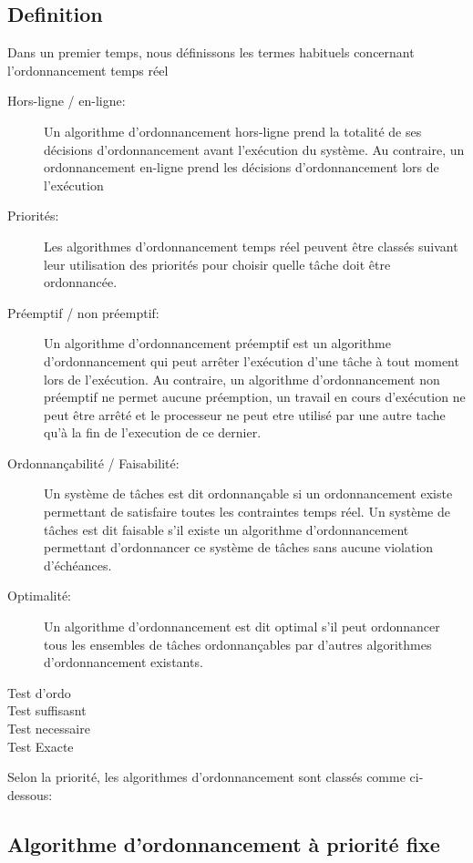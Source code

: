 \subsection*{Definition}
Dans un premier temps, nous définissons les termes habituels concernant
l'ordonnancement temps réel
\begin{description}
\item[Hors-ligne / en-ligne:] Un algorithme d’ordonnancement
  hors-ligne prend la totalité de ses décisions d’ordonnancement avant
  l’exécution du système. Au contraire, un ordonnancement en-ligne
  prend les décisions d’ordonnancement lors de l’exécution
\item[Priorités:] Les algorithmes d’ordonnancement temps réel peuvent
  être classés suivant leur utilisation des priorités pour choisir
  quelle tâche doit être ordonnancée.
\item[Préemptif / non préemptif:] Un algorithme d’ordonnancement
  préemptif est un algorithme d’ordonnancement qui peut arrêter
  l’exécution d’une tâche à tout moment lors de l’exécution. Au
  contraire, un algorithme d’ordonnancement non préemptif ne permet
  aucune préemption, un travail en cours d’exécution ne peut être
  arrêté et le processeur ne peut etre utilisé par une autre tache
  qu'à la fin de l'execution de ce dernier.
\item[Ordonnançabilité / Faisabilité:] Un système de tâches est dit
  ordonnançable si un ordonnancement existe permettant de satisfaire
  toutes les contraintes temps réel. Un système de tâches est dit
  faisable s’il existe un algorithme d’ordonnancement permettant
  d’ordonnancer ce système de tâches sans aucune violation
  d’échéances.
\item[Optimalité:] Un algorithme d’ordonnancement est dit optimal s’il
  peut ordonnancer tous les ensembles de tâches ordonnançables par
  d’autres algorithmes d’ordonnancement existants.

\item[Test d'ordo]
\item [Test suffisasnt]
\item[Test necessaire]
\item[Test Exacte]
\end{description}


Selon la priorité, les algorithmes d'ordonnancement sont classés comme
ci-dessous:
\subsection{Algorithme d’ordonnancement à priorité fixe}
